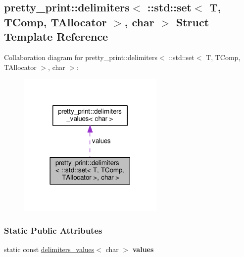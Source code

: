 \hypertarget{structpretty__print_1_1delimiters_3_01_1_1std_1_1set_3_01T_00_01TComp_00_01TAllocator_01_4_00_01char_01_4}{}\subsection{pretty\+\_\+print\+:\+:delimiters$<$ \+:\+:std\+:\+:set$<$ T, T\+Comp, T\+Allocator $>$, char $>$ Struct Template Reference}
\label{structpretty__print_1_1delimiters_3_01_1_1std_1_1set_3_01T_00_01TComp_00_01TAllocator_01_4_00_01char_01_4}


Collaboration diagram for pretty\+\_\+print\+:\+:delimiters$<$ \+:\+:std\+:\+:set$<$ T, T\+Comp, T\+Allocator $>$, char $>$\+:
\nopagebreak
\begin{figure}[H]
\begin{center}
\leavevmode
\includegraphics[width=201pt]{structpretty__print_1_1delimiters_3_01_1_1std_1_1set_3_01T_00_01TComp_00_01TAllocator_01_4_00_01char_01_4__coll__graph}
\end{center}
\end{figure}
\subsubsection*{Static Public Attributes}
\begin{DoxyCompactItemize}
\item 
static const \hyperlink{structpretty__print_1_1delimiters__values}{delimiters\+\_\+values}$<$ char $>$ {\bfseries values}\hypertarget{structpretty__print_1_1delimiters_3_01_1_1std_1_1set_3_01T_00_01TComp_00_01TAllocator_01_4_00_01char_01_4_a652c5ba5a72953f2c64b08bb7c1f053c}{}\label{structpretty__print_1_1delimiters_3_01_1_1std_1_1set_3_01T_00_01TComp_00_01TAllocator_01_4_00_01char_01_4_a652c5ba5a72953f2c64b08bb7c1f053c}

\end{DoxyCompactItemize}


